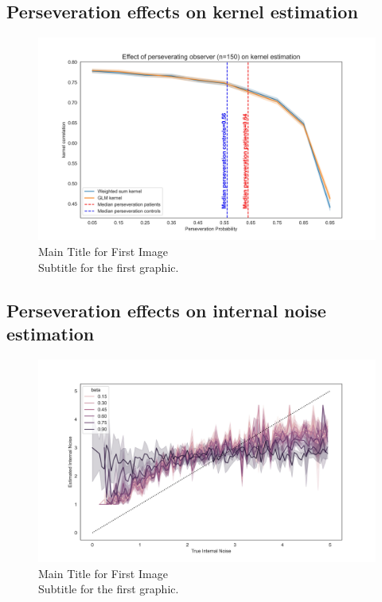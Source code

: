 \subsection{Perseveration effects on kernel estimation}
\begin{figure}[ht!]
    \centering
    \includegraphics[width=15cm]{MainLayout/Images/chapter5/kernel_perseverating_observer.jpg}
    \caption{Main Title for First Image \\ \small Subtitle for the first graphic.}
    \label{fig:kernel_perseverating_observer}
\end{figure}
\subsection{Perseveration effects on internal noise estimation}

\begin{figure}[ht!]
    \centering
    \includegraphics[width=15cm]{MainLayout/Images/chapter5/overestimation_noise.jpg}
    \caption{Main Title for First Image \\ \small Subtitle for the first graphic.}
    \label{fig:overestimation_noise}
\end{figure}


